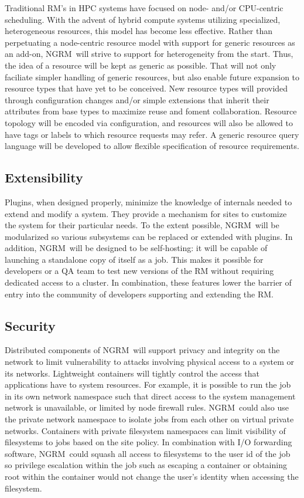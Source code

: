 \documentclass{article}
\newcommand{\ngrm}{NGRM}
\begin{document}
Traditional RM's in HPC systems have focused on node- and/or CPU-centric
scheduling. With the advent of hybrid compute systems utilizing specialized,
heterogeneous resources, this model has become less effective. Rather than
perpetuating a node-centric resource model with support for generic
resources as an add-on, \ngrm\ will strive to support for heterogeneity
from the start.
Thus, the idea of a resource will be kept as generic as
possible. That will not only faciliate simpler handling of generic resources,
but also enable future expansion to resource types that have yet to
be conceived. New resource types will provided through configuration changes
and/or simple extensions that inherit their attributes from base types 
to maximize reuse and foment collaboration.  Resource topology will be encoded via
configuration, and resources will also be allowed to have tags or labels
to which resource requests may refer. 
A generic resource query language will be developed to allow flexible
specification of resource requirements.

\subsection{Extensibility}

Plugins, when designed properly, minimize the knowledge of internals
needed to extend and modify a system. They provide a mechanism for
sites to customize the system for their particular needs. To the extent
possible, \ngrm\ will be modularized so various subsystems can be replaced
or extended with plugins.
In addition, \ngrm\ will be designed to be self-hosting: it will
be capable of launching a standalone copy of itself as a job. This makes
it possible for developers or a QA team to test new versions of the
RM without requiring dedicated access to a cluster.
In combination, these features lower the barrier of entry into the
community of developers supporting and extending the RM.

\subsection{Security}

Distributed components of \ngrm\ will support privacy and integrity on
the network to limit vulnerability to attacks involving physical access
to a system or its networks.
Lightweight containers will tightly control the access that
applications have to system resources. For example, it is possible to
run the job in its own network namespace such that direct access to the
system management network is unavailable, or limited by node firewall
rules. \ngrm\ could also use the private network namespace to isolate
jobs from each other on virtual private networks.  
Containers with private filesystem namespaces can limit visibility of
filesystems to jobs based on the site policy. 
In combination with I/O
forwarding software, \ngrm\ could squash all access to filesystems to
the user id of the job so privilege escalation within the job such as
escaping a container or obtaining root within the container would not
change the user's identity when accessing the filesystem.
\end{document}
